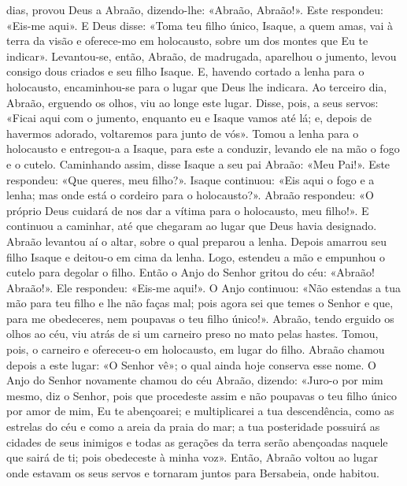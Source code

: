 \begin{paracol}{2}
{ dias, provou Deus a Abraão, dizendo-lhe: «Abraão, Abraão!». Este respondeu: «Eis-me aqui». E Deus disse: «Toma teu filho único, Isaque, a quem amas, vai à terra da visão e oferece-mo em holocausto, sobre um dos montes que Eu te indicar». Levantou-se, então, Abraão, de madrugada, aparelhou o jumento, levou consigo dous criados e seu filho Isaque. E, havendo cortado a lenha para o holocausto, encaminhou-se para o lugar que Deus lhe indicara. Ao terceiro dia, Abraão, erguendo os olhos, viu ao longe este lugar. Disse, pois, a seus servos: «Ficai aqui com o jumento, enquanto eu e Isaque vamos até lá; e, depois de havermos adorado, voltaremos para junto de vós». Tomou a lenha para o holocausto e entregou-a a Isaque, para este a conduzir, levando ele na mão o fogo e o cutelo. Caminhando assim, disse Isaque a seu pai Abraão: «Meu Pai!». Este respondeu: «Que queres, meu filho?». Isaque continuou: «Eis aqui o fogo e a lenha; mas onde está o cordeiro para o holocausto?». Abraão respondeu: «O próprio Deus cuidará de nos dar a vítima para o holocausto, meu filho!». E continuou a caminhar, até que chegaram ao lugar que Deus havia designado. Abraão levantou aí o altar, sobre o qual preparou a lenha. Depois amarrou seu filho Isaque e deitou-o em cima da lenha. Logo, estendeu a mão e empunhou o cutelo para degolar o filho. Então o Anjo do Senhor gritou do céu: «Abraão! Abraão!». Ele respondeu: «Eis-me aqui!». O Anjo continuou: «Não estendas a tua mão para teu filho e lhe não faças mal; pois agora sei que temes o Senhor e que, para me obedeceres, nem poupavas o teu filho único!». Abraão, tendo erguido os olhos ao céu, viu atrás de si um carneiro preso no mato pelas hastes. Tomou, pois, o carneiro e ofereceu-o em holocausto, em lugar do filho. Abraão chamou depois a este lugar: «O Senhor vê»; o qual ainda hoje conserva esse nome. O Anjo do Senhor novamente chamou do céu Abraão, dizendo: «Juro-o por mim mesmo, diz o Senhor, pois que procedeste assim e não poupavas o teu filho único por amor de mim, Eu te abençoarei; e multiplicarei a tua descendência, como as estrelas do céu e como a areia da praia do mar; a tua posteridade possuirá as cidades de seus inimigos e todas as gerações da terra serão abençoadas naquele que sairá de ti; pois obedeceste à minha voz». Então, Abraão voltou ao lugar onde estavam os seus servos e tornaram juntos para Bersabeia, onde habitou.
}\switchcolumn*{}\switchcolumn{}
\end{paracol}
